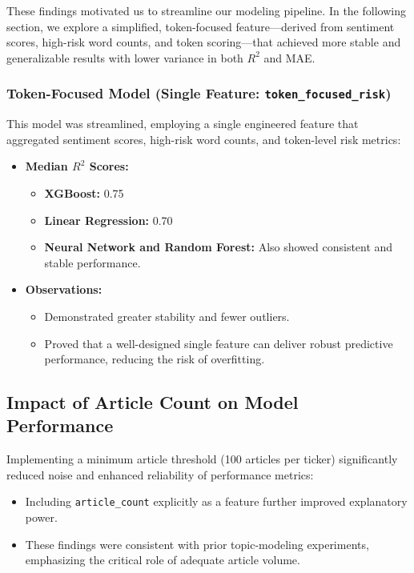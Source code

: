 \documentclass[twocolumn]{article}
\begin{document}
These findings motivated us to streamline our modeling pipeline. In the following section, we explore a simplified, token-focused feature—derived from sentiment scores, high-risk word counts, and token scoring—that achieved more stable and generalizable results with lower variance in both $R^2$ and MAE.


\subsubsection{Token-Focused Model (Single Feature: \texttt{token\_focused\_risk})}
This model was streamlined, employing a single engineered feature that aggregated sentiment scores, high-risk word counts, and token-level risk metrics:

\begin{itemize}
    \item \textbf{Median $R^2$ Scores:}
    \begin{itemize}
        \item \textbf{XGBoost:} 0.75
        \item \textbf{Linear Regression:} 0.70
        \item \textbf{Neural Network and Random Forest:} Also showed consistent and stable performance.
    \end{itemize}
    \item \textbf{Observations:}
    \begin{itemize}
        \item Demonstrated greater stability and fewer outliers.
        \item Proved that a well-designed single feature can deliver robust predictive performance, reducing the risk of overfitting.
    \end{itemize}
\end{itemize}

\subsection{Impact of Article Count on Model Performance}
Implementing a minimum article threshold (100 articles per ticker) significantly reduced noise and enhanced reliability of performance metrics:

\begin{itemize}
    \item Including \texttt{article\_count} explicitly as a feature further improved explanatory power.
    \item These findings were consistent with prior topic-modeling experiments, emphasizing the critical role of adequate article volume.
\end{itemize}
\end{document}

